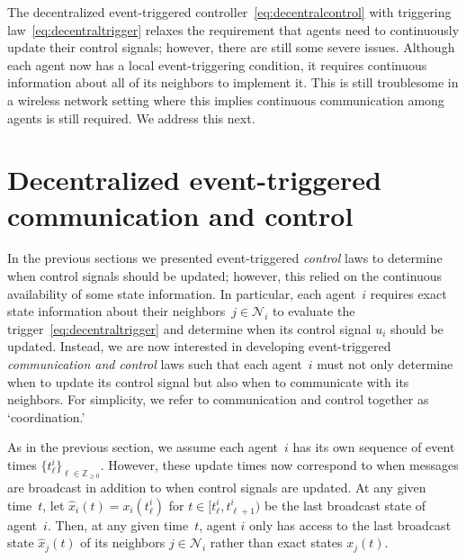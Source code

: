 \documentclass[]{book}
\newcommand{\integernonnegative}{\mathbb{Z}_{\ge 0}}
\newcommand{\NN}{{\mathcal{N}}}
\begin{document}
The decentralized event-triggered
controller~\eqref{eq:decentralcontrol} with triggering
law~\eqref{eq:decentraltrigger} relaxes the requirement that agents
need to continuously update their control signals; however, there are
still some severe issues. Although each agent now has a local
event-triggering condition, it requires continuous information about
all of its neighbors to implement it. This is still troublesome in a
wireless network setting where this implies continuous communication
among agents is still required.  We address this next.

\section{Decentralized event-triggered communication and control}\label{se:coordination}

In the previous sections we presented event-triggered \emph{control}
laws to determine when control signals should be updated; however,
this relied on the continuous availability of some state
information. In particular, each agent~$i$ requires exact state
information about their neighbors~$j \in \NN_i$ to evaluate the
trigger~\eqref{eq:decentraltrigger} and determine when its control
signal $u_i$ should be updated. Instead, we are now interested in
developing event-triggered \emph{communication and control} laws such
that each agent~$i$ must not only determine when to update its control
signal but also when to communicate with its neighbors. For
simplicity, we refer to communication and control together as
`coordination.'

As in the previous section, we assume each agent~$i$ has its own
sequence of event times $\{ t_\ell^i \}_{\ell \in
  \integernonnegative}$.  However, these update times now correspond
to when messages are broadcast in addition to when control signals are
updated. At any given time~$t$, let $\hat{x}_i(t) = x_i(t_\ell^i)$ for
$t \in [t_\ell^i, t_{\ell+1}^i )$ be the last broadcast state of
agent~$i$. Then, at any given time~$t$, agent $i$ only has access to
the last broadcast state $\hat{x}_j(t)$ of its neighbors $j \in \NN_i$
rather than exact states $x_j(t)$.
\end{document}
